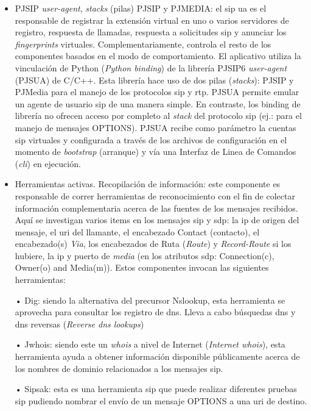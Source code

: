 \documentclass[a4paper,12pt]{report}
\begin{document}
\begin{itemize}

\item PJSIP \emph{user-agent}, \emph{stacks} (pilas) PJSIP y PJMEDIA:
el \ac{sip} \ac{ua} es el responsable de registrar la
extensión virtual en uno o varios servidores de registro, respuesta de
llamadas, respuesta a solicitudes \ac{sip} y anunciar los \emph{fingerprints} virtuales.
Complementariamente, controla el resto de los componentes basados en el modo de
comportamiento. El aplicativo utiliza la vinculación de Python (\emph{Python
binding}) de la librería PJSIP6 \emph{user-agent} (PJSUA) de C/C++. Esta librería hace
uso de dos pilas (\emph{stacks}): PJSIP y PJMedia para el manejo de los
protocolos \ac{sip} y \ac{rtp}. PJSUA permite emular un agente de usuario \ac{sip} de una
manera simple. En contraste, los binding de librería no ofrecen acceso por
completo al \emph{stack} del protocolo \ac{sip} (ej.: para el manejo de mensajes OPTIONS).
PJSUA recibe como parámetro la cuentas \ac{sip} virtuales y configurada a través de
los archivos de configuración en el momento de \emph{bootstrap} (arranque) y
vía una Interfaz de Linea de Comandos (\emph{\ac{cli}}) en
ejecución.  

\item Herramientas activas. Recopilación de información:
este componente es responsable de correr herramientas de reconocimiento con el
fin de colectar información complementaria acerca de las fuentes de los
mensajes recibidos. Aquí se investigan varios items en los mensajes \ac{sip} y \ac{sdp}:
la \ac{ip} de origen del mensaje, el \ac{uri} del llamante, el encabezado \mbox{Contact}
(contacto), el encabezado(s) \emph{Via}, los encabezados de Ruta (\emph{Route})
y \emph{\mbox{Record-Route}} si los hubiere, la \ac{ip} y puerto de \emph{media} (en los atributos
\ac{sdp}: Connection(c), Owner(o) and Media(m)). Estos componentes invocan las
siguientes herramientas: 

• Dig: siendo la alternativa del precursor Nslookup, esta herramienta
se aprovecha para consultar los registro de \ac{dns}. Lleva a cabo búsquedas \ac{dns} y
\ac{dns} reversas (\emph{Reverse \ac{dns} lookups}) 

• Jwhois: siendo este un \emph{whois} a nivel de Internet (\emph{Internet
whois}), esta herramienta ayuda a obtener información disponible públicamente
acerca de los nombres de dominio relacionados a los mensajes \ac{sip}.

• Sipsak: esta es una herramienta \ac{sip} que puede realizar diferentes
pruebas \ac{sip} pudiendo nombrar el envío de un mensaje OPTIONS a una \ac{uri} de destino. 


\end{itemize}
\end{document}
